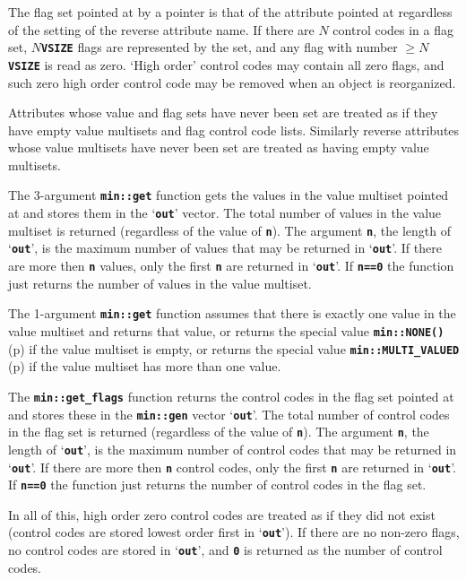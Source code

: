 \documentclass[12pt]{article}
\newcommand{\TT}[1]{{\tt \bfseries #1}}
\newcommand{\pagref}[1]{p\pageref{#1}}
\newcommand{\EOL}{\penalty \exhyphenpenalty}
\begin{document}
The flag set pointed at by a pointer is that of the attribute pointed
at regardless of the setting of the reverse attribute name.
If there are $N$ control codes in a flag set, $N$\TT{*VSIZE} flags are
represented by the set, and any flag with number $\geq N$\TT{*VSIZE} is
read as zero.  `High order' control codes may contain all zero flags,
and such zero high order control code may be removed when an object
is reorganized.

Attributes whose value and flag sets have never been set are treated
as if they have empty value multisets and flag control code lists.
Similarly reverse attributes
whose value multisets have never been set are treated as having empty value
multisets.

The 3-argument \TT{min::\EOL get} function gets the values in the value
multiset pointed at and stores them in the `\TT{out}' vector.
The total number of values in the value
multiset is returned (regardless of the value of \TT{n}).
The argument \TT{n}, the length of `\TT{out}',
is the maximum number of values that may be returned in `\TT{out}'.
If there are more then \TT{n} values, only the first \TT{n}
are returned in `\TT{out}'.
If \TT{n==0} the function just returns
the number of values in the value multiset.

The 1-argument \TT{min::\EOL get} function assumes that there is exactly
one value in the value multiset
and returns that value, or returns the special value
\TT{min::NONE()} (\pagref{MIN::NONE}) if the value multiset is empty,
or returns the special value
\TT{min::MULTI\_VALUED} (\pagref{MIN::MULTI_VALUED}) if the value multiset
has more than one value.

The \TT{min::\EOL get\_\EOL flags}
function returns the control codes in the flag set pointed at and stores
these in the \TT{min::gen} vector `\TT{out}'.
The total number of control codes in the flag set is returned
(regardless of the value of \TT{n}).
The argument \TT{n}, the length of `\TT{out}',
is the maximum number of control codes that may be returned in `\TT{out}'.
If there are more then \TT{n} control codes, only the first \TT{n}
are returned in `\TT{out}'.
If \TT{n==0} the function just returns
the number of control codes in the flag set.

In all of this, high order zero control codes are treated as if
they did not exist (control codes are stored lowest order first
in `\TT{out}').  If there are no non-zero flags, no control codes
are stored in `\TT{out}', and \TT{0} is returned as the number of
control codes.
\end{document}
